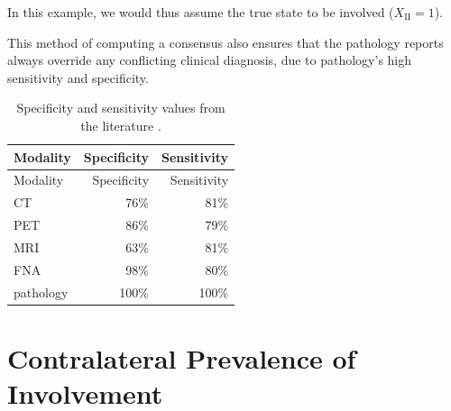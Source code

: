 \documentclass[
  sn-mathphys-num,
]{sn-jnl}
\begin{document}
In this example, we would thus assume the true state to be involved
(\(X_\text{II} = 1\)).

This method of computing a consensus also ensures that the pathology
reports always override any conflicting clinical diagnosis, due to
pathology's high sensitivity and specificity.

\begin{longtable}[]{@{}lrr@{}}
\caption{Specificity and sensitivity values from the literature
\citep{debondt_detection_2007, kyzas_18ffluorodeoxyglucose_2008}.}\label{tbl-spec-sens}\tabularnewline
\toprule\noalign{}
Modality & Specificity & Sensitivity \\
\midrule\noalign{}
\endfirsthead
\toprule\noalign{}
Modality & Specificity & Sensitivity \\
\midrule\noalign{}
\endhead
\bottomrule\noalign{}
\endlastfoot
CT & 76\% & 81\% \\
PET & 86\% & 79\% \\
MRI & 63\% & 81\% \\
FNA & 98\% & 80\% \\
pathology & 100\% & 100\% \\
\end{longtable}

\section{Contralateral Prevalence of
Involvement}\label{contralateral-prevalence-of-involvement}
\end{document}
